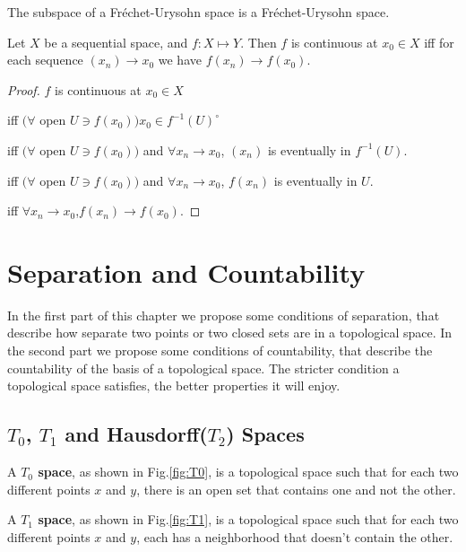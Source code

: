 \documentclass[12pt]{book}
\begin{document}
\begin{corollary}
	The subspace of a Fr\'echet-Urysohn space is a Fr\'echet-Urysohn space.
\end{corollary}

\begin{theorem}
	Let $X$ be a sequential space, and $f:X\mapsto Y$. Then $f$ is continuous at $x_0\in X$ iff for each sequence $(x_n)\rightarrow x_0$ we have $f(x_n)\rightarrow f(x_0)$.
\end{theorem}
\begin{proof}
	$f$ is continuous at $x_0\in X$ 
	
	iff $(\forall $ open $U\ni f(x_0))x_0\in f^{-1}(U)^\circ$ 
	
	iff $(\forall $ open $U\ni f(x_0))$ and $\forall x_n\rightarrow x_0$, $(x_n)$ is eventually in $f^{-1}(U)$.
	
	iff $(\forall $ open $U\ni f(x_0))$ and $\forall x_n\rightarrow x_0$, $f(x_n)$ is eventually in $U$.
	
	iff $\forall x_n\rightarrow x_0$,$f(x_n)\rightarrow f(x_0)$.
\end{proof}

\chapter{Separation and Countability}
In the first part of this chapter we propose some conditions of separation, that describe how separate two points or two closed sets are in a topological space. In the second part we propose some conditions of countability, that describe the countability of the basis of a topological space. The stricter condition a topological space satisfies, the better properties it will enjoy.
\section{$T_0$, $T_1$ and Hausdorff($T_2$) Spaces}
	\begin{definition}
		A {\bf $T_0$ space}, as shown in Fig.\ref{fig:T0}, is a topological space such that for each two different points $x$ and $y$, there is an open set that contains one and not the other.
	\end{definition}
	
	\begin{definition}
		A {\bf $T_1$ space}, as shown in Fig.\ref{fig:T1}, is a topological space such that for each two different points $x$ and $y$, each has a neighborhood that doesn't contain the other.
	\end{definition}
	
\end{document}
